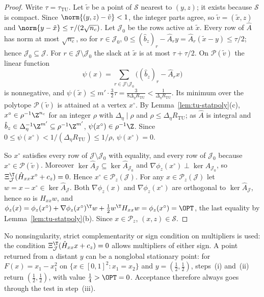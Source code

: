 \begin{proof}
Write $\tau=\tau_{\mathrm{TU}}$. Let $\tilde v$ be a point of $\mathcal S$
nearest to $(y,z)$; it exists because $\mathcal S$ is compact. Since
$\norm{(y,z)-\tilde v}<1$, the integer parts agree, so $\tilde v=(\tilde x,z)$
and $\norm{y-\tilde x}\le\tau/(2\sqrt{n_c})$. Let $\mathcal J_0$ be the rows
active at $\tilde x$. Every row of $\hat A$ has norm at most $\sqrt{n_c}$, so
for $r\in\mathcal J_0$,
$0\le(\hat b_z)_r-\hat A_ry=\hat A_r(\tilde x-y)\le\tau/2$; hence
$\mathcal J_0\subseteq\mathcal J$. For $r\in\mathcal J\setminus\mathcal J_0$ the
slack at $\tilde x$ is at most $\tau+\tau/2$. On $\mathcal P(\tilde v)$ the
linear function
\[
\psi(x)=\sum_{r\in\mathcal J\setminus\mathcal J_0}\bigl((\hat b_z)_r-\hat A_rx\bigr)
\]
is nonnegative, and
$\psi(\tilde x)\le m'\cdot\frac32\tau=\frac3{8\Delta_\eta R_{\mathrm{TU}}}
<\frac1{\Delta_\eta R_{\mathrm{TU}}}$. Its minimum over the polytope
$\mathcal P(\tilde v)$ is attained at a vertex $x^\circ$. By
Lemma~\ref{lem:tu-statpoly}(c), $x^\circ\in\rho^{-1}\Z^{n_c}$ for an integer
$\rho$ with $\Delta_\eta\mid\rho$ and $\rho\le\Delta_\eta R_{\mathrm{TU}}$; as
$\hat A$ is integral and
$\hat b_z\in\Delta_\eta^{-1}\Z^{m'}\subseteq\rho^{-1}\Z^{m'}$,
$\psi(x^\circ)\in\rho^{-1}\Z$. Since
$0\le\psi(x^\circ)<1/(\Delta_\eta R_{\mathrm{TU}})\le1/\rho$,
$\psi(x^\circ)=0$.

So $x^\circ$ satisfies every row of $\mathcal J\setminus\mathcal J_0$ with
equality, and every row of $\mathcal J_0$ because $x^\circ\in\mathcal P(\tilde v)$.
Moreover $\ker\hat A_{\mathcal J}\subseteq\ker\hat A_{\mathcal J_0}$ and
$\nabla\phi_z(x^\circ)\perp\ker\hat A_{\mathcal J_0}$, so
$\Xi_{\mathcal J}^{\T}(\hat H_{xx}x^\circ+c_z)=0$. Hence
$x^\circ\in\mathcal P_z(\mathcal J)$. For any $x\in\mathcal P_z(\mathcal J)$ let
$w=x-x^\circ\in\ker\hat A_{\mathcal J}$. Both $\nabla\phi_z(x)$ and
$\nabla\phi_z(x^\circ)$ are orthogonal to $\ker\hat A_{\mathcal J}$, hence so is
$H_{xx}w$, and
$\phi_z(x)=\phi_z(x^\circ)+\nabla\phi_z(x^\circ)^{\T}w+\frac12w^{\T}H_{xx}w=\phi_z(x^\circ)=\OPT$,
the last equality by Lemma~\ref{lem:tu-statpoly}(b). Since
$x\in\mathcal P_z$, $(x,z)\in\mathcal S$.
\end{proof}

No nonsingularity, strict complementarity or sign condition on multipliers is
used: the condition $\Xi_{\mathcal J}^{\T}(\hat H_{xx}x+c_z)=0$ allows
multipliers of either sign. A point returned from a distant $y$ can be a
nonglobal stationary point: for $F(x)=x_1-x_1^2$ on
$\{x\in[0,1]^2:x_1=x_2\}$ and $y=(\frac12,\frac12)$, steps~(i) and~(ii)
return $(\frac12,\frac12)$, with value $\frac14>\OPT=0$. Acceptance therefore
always goes through the test in step~(iii).


